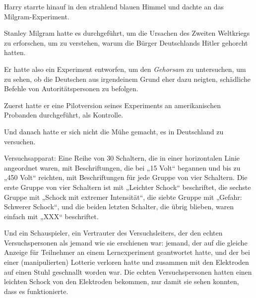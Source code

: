 Harry starrte hinauf in den strahlend blauen Himmel und dachte an das Milgram-Experiment.

Stanley Milgram hatte es durchgeführt, um die Ursachen des Zweiten Weltkriegs zu erforschen, um zu verstehen, warum die Bürger Deutschlands Hitler gehorcht hatten.

Er hatte also ein Experiment entworfen, um den \emph{Gehorsam} zu untersuchen, um zu sehen, ob die Deutschen aus irgendeinem Grund eher dazu neigten, schädliche Befehle von Autoritätspersonen zu befolgen.

Zuerst hatte er eine Pilotversion seines Experiments an amerikanischen Probanden durchgeführt, als Kontrolle.

Und danach hatte er sich nicht die Mühe gemacht, es in Deutschland zu versuchen.

Versuchsapparat: Eine Reihe von 30 Schaltern, die in einer horizontalen Linie angeordnet waren, mit Beschriftungen, die bei „15 Volt“ begannen und bis zu „450 Volt“ reichten, mit Beschriftungen für jede Gruppe von vier Schaltern. Die erste Gruppe von vier Schaltern ist mit „Leichter Schock“ beschriftet, die sechste Gruppe mit „Schock mit extremer Intensität“, die siebte Gruppe mit „Gefahr: Schwerer Schock“, und die beiden letzten Schalter, die übrig blieben, waren einfach mit „XXX“ beschriftet.

Und ein Schauspieler, ein Vertrauter des Versuchsleiters, der den echten Versuchspersonen als jemand wie sie erschienen war: jemand, der auf die gleiche Anzeige für Teilnehmer an einem Lernexperiment geantwortet hatte, und der bei einer (manipulierten) Lotterie verloren hatte und zusammen mit den Elektroden auf einen Stuhl geschnallt worden war. Die echten Versuchspersonen hatten einen leichten Schock von den Elektroden bekommen, nur damit sie sehen konnten, dass es funktionierte.

